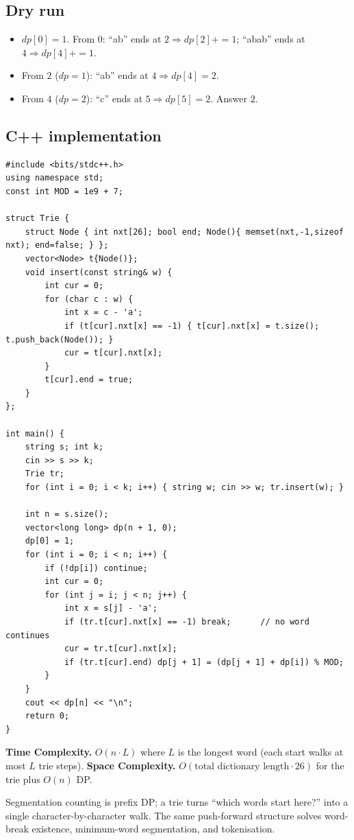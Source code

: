 \subsection*{Dry run}


\begin{itemize}
  \item $\textit{dp}[0]=1$. From $0$: ``ab'' ends at $2\Rightarrow
        \textit{dp}[2]{+}{=}1$; ``abab'' ends at $4\Rightarrow
        \textit{dp}[4]{+}{=}1$.
  \item From $2$ ($\textit{dp}=1$): ``ab'' ends at $4\Rightarrow
        \textit{dp}[4]=2$.
  \item From $4$ ($\textit{dp}=2$): ``c'' ends at $5\Rightarrow
        \textit{dp}[5]=2$. Answer $2$.
\end{itemize}

\subsection*{C++ implementation}

\begin{lstlisting}
#include <bits/stdc++.h>
using namespace std;
const int MOD = 1e9 + 7;

struct Trie {
    struct Node { int nxt[26]; bool end; Node(){ memset(nxt,-1,sizeof nxt); end=false; } };
    vector<Node> t{Node()};
    void insert(const string& w) {
        int cur = 0;
        for (char c : w) {
            int x = c - 'a';
            if (t[cur].nxt[x] == -1) { t[cur].nxt[x] = t.size(); t.push_back(Node()); }
            cur = t[cur].nxt[x];
        }
        t[cur].end = true;
    }
};

int main() {
    string s; int k;
    cin >> s >> k;
    Trie tr;
    for (int i = 0; i < k; i++) { string w; cin >> w; tr.insert(w); }

    int n = s.size();
    vector<long long> dp(n + 1, 0);
    dp[0] = 1;
    for (int i = 0; i < n; i++) {
        if (!dp[i]) continue;
        int cur = 0;
        for (int j = i; j < n; j++) {
            int x = s[j] - 'a';
            if (tr.t[cur].nxt[x] == -1) break;      // no word continues
            cur = tr.t[cur].nxt[x];
            if (tr.t[cur].end) dp[j + 1] = (dp[j + 1] + dp[i]) % MOD;
        }
    }
    cout << dp[n] << "\n";
    return 0;
}
\end{lstlisting}

\begin{complexitybox}
\textbf{Time Complexity.} $O(n\cdot L)$ where $L$ is the longest word
(each start walks at most $L$ trie steps). \textbf{Space Complexity.}
$O(\text{total dictionary length}\cdot26)$ for the trie plus $O(n)$ DP.
\end{complexitybox}

\begin{takeawaybox}
Segmentation counting is prefix DP; a trie turns ``which words start
here?'' into a single character-by-character walk. The same push-forward
structure solves word-break existence, minimum-word segmentation, and
tokenisation.
\end{takeawaybox}
